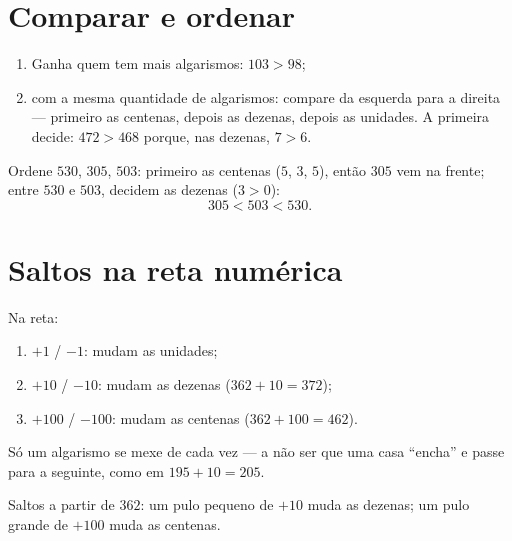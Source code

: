 \section{Comparar e ordenar}

\begin{method}\label{met:g2:numbers:compare}
\begin{enumerate}
  \item Ganha quem tem mais algarismos: $103 > 98$;
  \item com a mesma quantidade de algarismos: compare da esquerda
        para a direita --- primeiro as centenas, depois as dezenas,
        depois as unidades. A primeira  decide:
        $472 > 468$ porque, nas dezenas, $7 > 6$.
\end{enumerate}
\end{method}

\begin{example}\label{ex:g2:numbers:order}
Ordene $530$, $305$, $503$: primeiro as centenas ($5$, $3$, $5$),
então $305$ vem na frente; entre $530$ e $503$, decidem as dezenas
($3 > 0$):
\[
305 < 503 < 530 .
\]
\end{example}

\section{Saltos na reta numérica}

\begin{method}\label{met:g2:numbers:jumps}
Na reta:
\begin{enumerate}
  \item $+1$ / $-1$: mudam as unidades;
  \item $+10$ / $-10$: mudam as dezenas ($362 + 10 = 372$);
  \item $+100$ / $-100$: mudam as centenas ($362 + 100 = 462$).
\end{enumerate}
Só um algarismo se mexe de cada vez --- a não ser que uma casa
``encha'' e passe para a seguinte, como em $195 + 10 = 205$.
\end{method}

\begin{omfigure}

{\small Saltos a partir de $362$: um pulo pequeno de $+10$ muda as
dezenas; um pulo grande de $+100$ muda as centenas.}
\end{omfigure}

